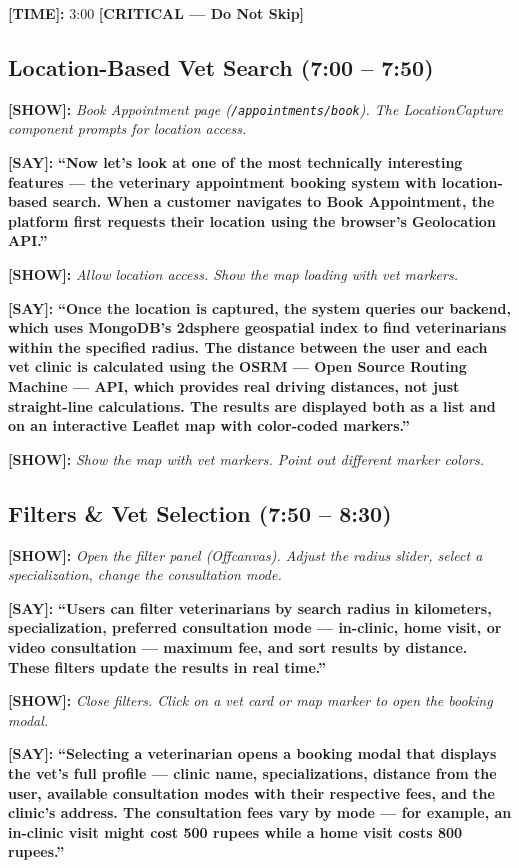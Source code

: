 \documentclass[12pt,a4paper]{article}
\newcommand{\say}[1]{\textbf{\textcolor{narration}{[SAY]:}} \textbf{``#1''}}
\newcommand{\show}[1]{\textbf{\textcolor{screen}{[SHOW]:}} \textit{#1}}
\newcommand{\timing}[1]{\textbf{\textcolor{timing}{[TIME]:}} #1}
\newcommand{\critical}{\textcolor{critical}{\textbf{[CRITICAL --- Do Not Skip]}}}
\begin{document}
\timing{3:00} \hfill \critical

\subsection{Location-Based Vet Search (7:00 -- 7:50)}

\show{Book Appointment page (\texttt{/appointments/book}). The LocationCapture component prompts for location access.}

\say{Now let's look at one of the most technically interesting features --- the veterinary appointment booking system with location-based search. When a customer navigates to Book Appointment, the platform first requests their location using the browser's Geolocation API.}

\show{Allow location access. Show the map loading with vet markers.}

\say{Once the location is captured, the system queries our backend, which uses MongoDB's 2dsphere geospatial index to find veterinarians within the specified radius. The distance between the user and each vet clinic is calculated using the OSRM --- Open Source Routing Machine --- API, which provides real driving distances, not just straight-line calculations. The results are displayed both as a list and on an interactive Leaflet map with color-coded markers.}

\show{Show the map with vet markers. Point out different marker colors.}

\subsection{Filters \& Vet Selection (7:50 -- 8:30)}

\show{Open the filter panel (Offcanvas). Adjust the radius slider, select a specialization, change the consultation mode.}

\say{Users can filter veterinarians by search radius in kilometers, specialization, preferred consultation mode --- in-clinic, home visit, or video consultation --- maximum fee, and sort results by distance. These filters update the results in real time.}

\show{Close filters. Click on a vet card or map marker to open the booking modal.}

\say{Selecting a veterinarian opens a booking modal that displays the vet's full profile --- clinic name, specializations, distance from the user, available consultation modes with their respective fees, and the clinic's address. The consultation fees vary by mode --- for example, an in-clinic visit might cost 500 rupees while a home visit costs 800 rupees.}
\end{document}
